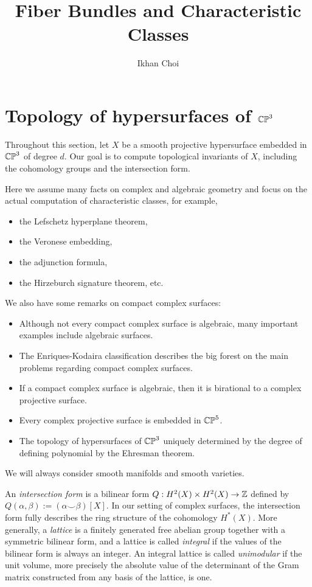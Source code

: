 \documentclass{../../../small}
\begin{document}
\title{Fiber Bundles and Characteristic Classes}
\author{Ikhan Choi}
\maketitle


\section{Topology of hypersurfaces of $\mathbb{CP}^3$}
Throughout this section, let $X$ be a smooth projective hypersurface embedded in $\mathbb{CP}^3$ of degree $d$.
Our goal is to compute topological invariants of $X$, including the cohomology groups and the intersection form.

Here we assume many facts on complex and algebraic geometry and focus on the actual computation of characteristic classes, for example,
\begin{itemize}
\item the Lefschetz hyperplane theorem,
\item the Veronese embedding,
\item the adjunction formula,
\item the Hirzeburch signature theorem, etc.
\end{itemize}
We also have some remarks on compact complex surfaces:
\begin{itemize} 
\item Although not every compact complex surface is algebraic, many important examples include algebraic surfaces.
\item The Enriques-Kodaira classification describes the big forest on the main problems regarding compact complex surfaces.
\item If a compact complex surface is algebraic, then it is birational to a complex projective surface.
\item Every complex projective surface is embedded in $\mathbb{CP}^5$.
\item The topology of hypersurfaces of $\mathbb{CP}^3$ uniquely determined by the degree of defining polynomial by the Ehresman theorem.
\end{itemize}
We will always consider smooth manifolds and smooth varieties.

An \emph{intersection form} is a bilinear form $Q:H^2(X)\times H^2(X)\to\mathbb{Z}$ defined by $Q(\alpha,\beta):=(\alpha\smile\beta)[X]$.
In our setting of complex surfaces, the intersection form fully describes the ring structure of the cohomology $H^*(X)$.
More generally, a \emph{lattice} is a finitely generated free abelian group together with a symmetric bilinear form, and a lattice is called \emph{integral} if the values of the bilinear form is always an integer.
An integral lattice is called \emph{unimodular} if the unit volume, more precisely the absolute value of the determinant of the Gram matrix constructed from any basis of the lattice, is one.
\end{document}
